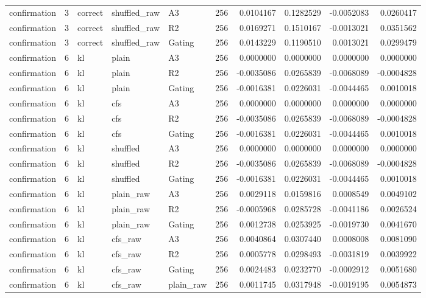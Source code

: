 \begin{tabular}{lrlllrrrrr}
confirmation & 3 & correct & shuffled_raw & A3 & 256 & 0.0104167 & 0.1282529 & -0.0052083 & 0.0260417 \\
confirmation & 3 & correct & shuffled_raw & R2 & 256 & 0.0169271 & 0.1510167 & -0.0013021 & 0.0351562 \\
confirmation & 3 & correct & shuffled_raw & Gating & 256 & 0.0143229 & 0.1190510 & 0.0013021 & 0.0299479 \\
confirmation & 6 & kl & plain & A3 & 256 & 0.0000000 & 0.0000000 & 0.0000000 & 0.0000000 \\
confirmation & 6 & kl & plain & R2 & 256 & -0.0035086 & 0.0265839 & -0.0068089 & -0.0004828 \\
confirmation & 6 & kl & plain & Gating & 256 & -0.0016381 & 0.0226031 & -0.0044465 & 0.0010018 \\
confirmation & 6 & kl & cfs & A3 & 256 & 0.0000000 & 0.0000000 & 0.0000000 & 0.0000000 \\
confirmation & 6 & kl & cfs & R2 & 256 & -0.0035086 & 0.0265839 & -0.0068089 & -0.0004828 \\
confirmation & 6 & kl & cfs & Gating & 256 & -0.0016381 & 0.0226031 & -0.0044465 & 0.0010018 \\
confirmation & 6 & kl & shuffled & A3 & 256 & 0.0000000 & 0.0000000 & 0.0000000 & 0.0000000 \\
confirmation & 6 & kl & shuffled & R2 & 256 & -0.0035086 & 0.0265839 & -0.0068089 & -0.0004828 \\
confirmation & 6 & kl & shuffled & Gating & 256 & -0.0016381 & 0.0226031 & -0.0044465 & 0.0010018 \\
confirmation & 6 & kl & plain_raw & A3 & 256 & 0.0029118 & 0.0159816 & 0.0008549 & 0.0049102 \\
confirmation & 6 & kl & plain_raw & R2 & 256 & -0.0005968 & 0.0285728 & -0.0041186 & 0.0026524 \\
confirmation & 6 & kl & plain_raw & Gating & 256 & 0.0012738 & 0.0253925 & -0.0019730 & 0.0041670 \\
confirmation & 6 & kl & cfs_raw & A3 & 256 & 0.0040864 & 0.0307440 & 0.0008008 & 0.0081090 \\
confirmation & 6 & kl & cfs_raw & R2 & 256 & 0.0005778 & 0.0298493 & -0.0031819 & 0.0039922 \\
confirmation & 6 & kl & cfs_raw & Gating & 256 & 0.0024483 & 0.0232770 & -0.0002912 & 0.0051680 \\
confirmation & 6 & kl & cfs_raw & plain_raw & 256 & 0.0011745 & 0.0317948 & -0.0019195 & 0.0054873 \\

\end{tabular}
